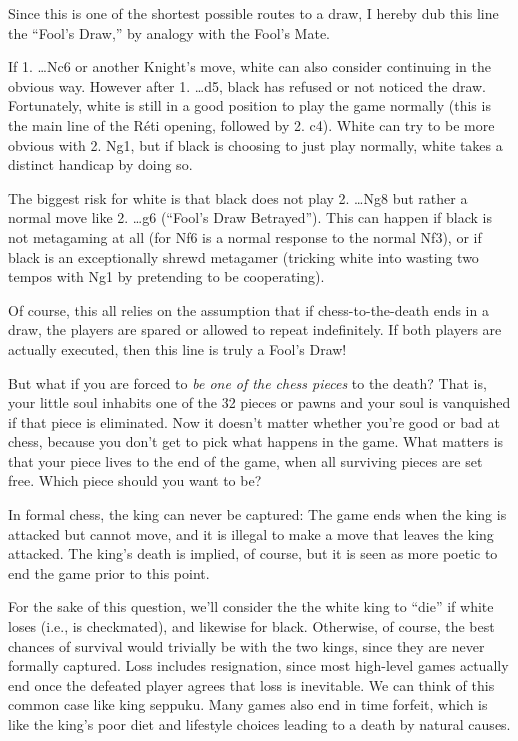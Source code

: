 \documentclass[twocolumn]{article}
\begin{document}
{  Since this is one of the shortest possible routes to a draw, I hereby
  dub this line the ``Fool's Draw,'' by analogy with the Fool's Mate.

  If 1. \ldots Nc6 or another Knight's move, white can also consider
  continuing in the obvious way. However after 1. \ldots d5, black has
  refused or not noticed the draw. Fortunately, white is still in a
  good position to play the game normally (this is the main line of
  the R\'eti opening, followed by 2. c4). White can try to be more
  obvious with 2. Ng1, but if black is choosing to just play normally,
  white takes a distinct handicap by doing so.

  The biggest risk for white is that black does not play 2. \ldots Ng8
  but rather a normal move like 2. \ldots g6 (``Fool's Draw Betrayed'').
  This can happen if black is not metagaming at all (for Nf6 is a
  normal response to the normal Nf3), or if black is an exceptionally
  shrewd metagamer (tricking white into wasting two tempos with Ng1
  by pretending to be cooperating).

  Of course, this all relies on the assumption that if
  chess-to-the-death ends in a draw, the players are spared or allowed
  to repeat indefinitely. If both players are actually executed, then
  this line is truly a Fool's Draw!
}

But what if you are forced to {\it be one of the chess pieces} to the
death? That is, your little soul inhabits one of the 32 pieces or
pawns and your soul is vanquished if that piece is eliminated. Now it
doesn't matter whether you're good or bad at chess, because you don't
get to pick what happens in the game. What matters is that your piece
lives to the end of the game, when all surviving pieces are set free.
Which piece should you want to be?

In formal chess, the king can never be captured: The game ends when
the king is attacked but cannot move, and it is illegal to make a move
that leaves the king attacked. The king's death is implied, of course,
but it is seen as more poetic to end the game prior to this point.

For the sake of this question, we'll consider the the white king to
``die'' if white loses (i.e., is checkmated), and likewise for black.
Otherwise, of course, the best chances of survival would trivially be
with the two kings, since they are never formally captured. Loss
includes resignation, since most high-level games actually end once
the defeated player agrees that loss is inevitable. We can think of
this common case like king seppuku. Many games also end in time
forfeit, which is like the king's poor diet and lifestyle choices
leading to a death by natural causes.
\end{document}
